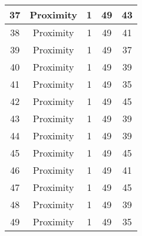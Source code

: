 \documentclass[results.tex]{subfiles}
\begin{document}
\begin{center}
\begin{tabular}{| c || c | c | c | c |}
            \hline
            37                      & Proximity                    & 1                      & 49                      & 43                   \\
            \hline
            38                      & Proximity                    & 1                      & 49                      & 41                   \\
            \hline
            39                      & Proximity                    & 1                      & 49                      & 37                   \\
            \hline
            40                      & Proximity                    & 1                      & 49                      & 39                   \\
            \hline
            41                      & Proximity                    & 1                      & 49                      & 35                   \\
            \hline
            42                      & Proximity                    & 1                      & 49                      & 45                   \\
            \hline
            43                      & Proximity                    & 1                      & 49                      & 39                   \\
            \hline
            44                      & Proximity                    & 1                      & 49                      & 39                   \\
            \hline
            45                      & Proximity                    & 1                      & 49                      & 45                   \\
            \hline
            46                      & Proximity                    & 1                      & 49                      & 41                   \\
            \hline
            47                      & Proximity                    & 1                      & 49                      & 45                   \\
            \hline
            48                      & Proximity                    & 1                      & 49                      & 39                   \\
            \hline
            49                      & Proximity                    & 1                      & 49                      & 35                   \\
            \hline
        \end{tabular}
    \end{center}
\end{document}

